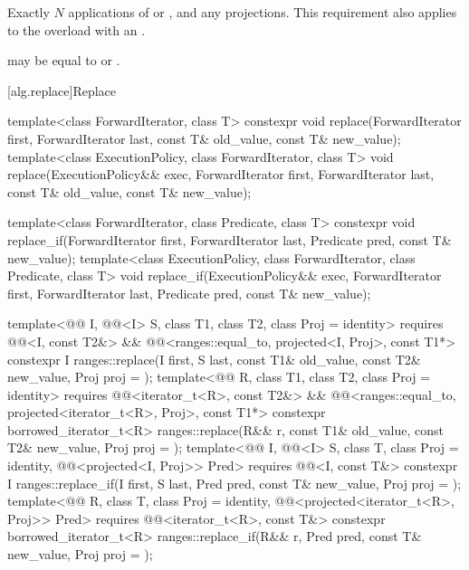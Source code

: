 \begin{itemdescr}
\pnum
\complexity
Exactly $N$ applications of  or , and
any projections.
This requirement also applies to the overload with an .

\pnum
\remarks
{} may be equal to  or .
\end{itemdescr}

[alg.replace]{Replace}

%
%
\begin{itemdecl}
template<class ForwardIterator, class T>
  constexpr void replace(ForwardIterator first, ForwardIterator last,
                         const T& old_value, const T& new_value);
template<class ExecutionPolicy, class ForwardIterator, class T>
  void replace(ExecutionPolicy&& exec,
               ForwardIterator first, ForwardIterator last,
               const T& old_value, const T& new_value);

template<class ForwardIterator, class Predicate, class T>
  constexpr void replace_if(ForwardIterator first, ForwardIterator last,
                            Predicate pred, const T& new_value);
template<class ExecutionPolicy, class ForwardIterator, class Predicate, class T>
  void replace_if(ExecutionPolicy&& exec,
                  ForwardIterator first, ForwardIterator last,
                  Predicate pred, const T& new_value);

template<@@ I, @@<I> S, class T1, class T2, class Proj = identity>
  requires @@<I, const T2&> &&
           @@<ranges::equal_to, projected<I, Proj>, const T1*>
  constexpr I
    ranges::replace(I first, S last, const T1& old_value, const T2& new_value, Proj proj = {});
template<@@ R, class T1, class T2, class Proj = identity>
  requires @@<iterator_t<R>, const T2&> &&
           @@<ranges::equal_to, projected<iterator_t<R>, Proj>, const T1*>
  constexpr borrowed_iterator_t<R>
    ranges::replace(R&& r, const T1& old_value, const T2& new_value, Proj proj = {});
template<@@ I, @@<I> S, class T, class Proj = identity,
         @@<projected<I, Proj>> Pred>
  requires @@<I, const T&>
  constexpr I ranges::replace_if(I first, S last, Pred pred, const T& new_value, Proj proj = {});
template<@@ R, class T, class Proj = identity,
         @@<projected<iterator_t<R>, Proj>> Pred>
  requires @@<iterator_t<R>, const T&>
  constexpr borrowed_iterator_t<R>
    ranges::replace_if(R&& r, Pred pred, const T& new_value, Proj proj = {});
\end{itemdecl}

